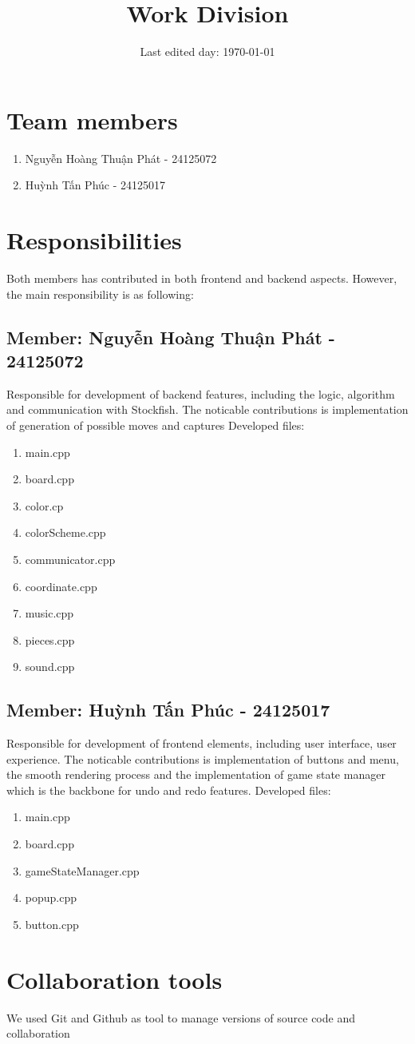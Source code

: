 \documentclass[a4paper, 10pt, titlepage]{article}
\title{Work Division}
\date{Last edited day: \selectlanguage{english}\today}
\author{}
\begin{document}
\maketitle
\section{Team members}
\begin{enumerate}
    \item Nguyễn Hoàng Thuận Phát - 24125072
    \item Huỳnh Tấn Phúc - 24125017
\end{enumerate}
\section{Responsibilities}
Both members has contributed in both frontend and backend aspects. However, the main responsibility is as following:
\subsection{ Member: Nguyễn Hoàng Thuận Phát - 24125072}
Responsible for development of backend features, including the logic, algorithm and communication with Stockfish. The noticable contributions is implementation of generation of possible moves and captures
Developed files:
\ttfamily
\begin{enumerate}
    \item main.cpp
    \item board.cpp
    \item color.cp
    \item colorScheme.cpp
    \item communicator.cpp
    \item coordinate.cpp
    \item music.cpp
    \item pieces.cpp
    \item sound.cpp
\end{enumerate}
\rmfamily
\subsection{Member: Huỳnh Tấn Phúc - 24125017}
Responsible for development of frontend elements, including user interface, user experience. The noticable contributions is implementation of buttons and menu, the smooth rendering process and the implementation of game state manager which is the backbone for undo and redo features.
Developed files:
\ttfamily
\begin{enumerate}
    \item main.cpp
    \item board.cpp
    \item gameStateManager.cpp
    \item popup.cpp
    \item button.cpp
\end{enumerate}
\rmfamily
\section{Collaboration tools}
We used Git and Github as tool to manage versions of source code and collaboration
\end{document}
